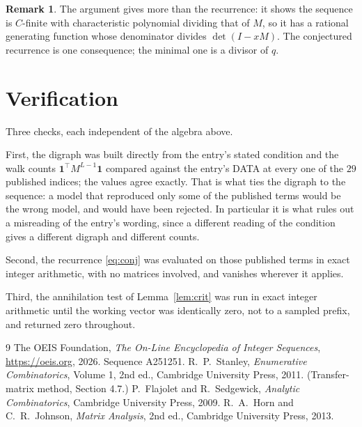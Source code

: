 \documentclass[11pt,a4paper]{article}
\theoremstyle{plain}
\theoremstyle{definition}
\newtheorem{remark}[theorem]{Remark}
\begin{document}
\begin{remark}
The argument gives more than the recurrence: it shows the sequence is $C$-finite with
characteristic polynomial dividing that of $M$, so it has a rational generating function
whose denominator divides $\det(I-xM)$. The conjectured recurrence is one consequence; the
minimal one is a divisor of $q$.
\end{remark}

\section{Verification}

Three checks, each independent of the algebra above.

First, the digraph was built directly from the entry's stated condition and the walk counts
$\mathbf{1}^{\!\top}M^{L-1}\mathbf{1}$ compared against the entry's DATA at
every one of the $29$ published indices; the values agree exactly. That is what ties
the digraph to the sequence: a model that reproduced only some of the published terms would
be the wrong model, and would have been rejected. In particular it is what rules out a
misreading of the entry's wording, since a different reading of the condition gives a
different digraph and different counts.

Second, the recurrence \eqref{eq:conj} was evaluated on those published terms in exact
integer arithmetic, with no matrices involved, and vanishes wherever it applies.

Third, the annihilation test of Lemma~\ref{lem:crit} was run in exact integer arithmetic
until the working vector was identically zero, not to a sampled prefix, and returned zero
throughout.

\begin{thebibliography}{9}
 The OEIS Foundation, \emph{The On-Line Encyclopedia of Integer
Sequences}, \url{https://oeis.org}, 2026. Sequence A251251.
 R.~P.~Stanley, \emph{Enumerative Combinatorics}, Volume 1, 2nd ed.,
Cambridge University Press, 2011. (Transfer-matrix method, Section 4.7.)
 P.~Flajolet and R.~Sedgewick, \emph{Analytic Combinatorics}, Cambridge
University Press, 2009.
 R.~A.~Horn and C.~R.~Johnson, \emph{Matrix Analysis}, 2nd ed., Cambridge
University Press, 2013.
\end{thebibliography}
\end{document}
